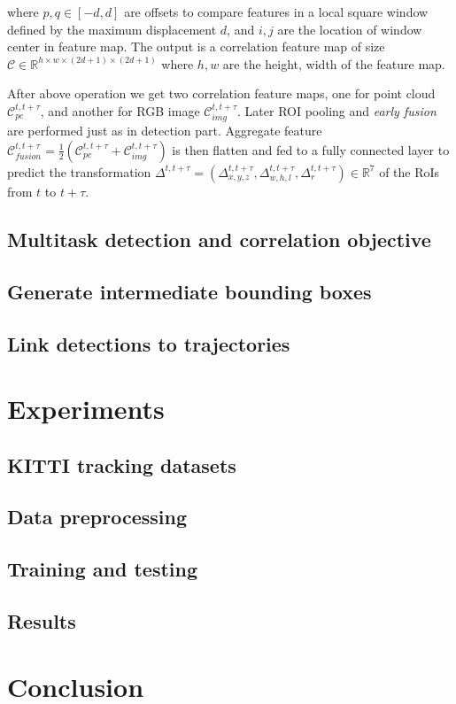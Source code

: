 \documentclass{bmvc2k}
\begin{document}
where $p, q \in [-d, d]$ are offsets to compare features in a local square window defined by the maximum displacement $d$, and $i, j$ are the location of window center in feature map. The output is a correlation feature map of size $\mathcal{C} \in \mathbb{R}^{h \times w \times (2d+1) \times (2d+1)}$ where $h, w$ are the height, width of the feature map.

After above operation we get two correlation feature maps, one for point cloud $\mathcal{C}^{t, t+\tau}_{pc}$, and another for RGB image $\mathcal{C}^{t, t+\tau}_{img}$. Later ROI pooling and \textit{early fusion} are performed just as in detection part. Aggregate feature $\mathcal{C}^{t,t+\tau}_{fusion} = \frac{1}{2}(\mathcal{C}^{t, t+\tau}_{pc} + \mathcal{C}^{t, t+\tau}_{img})$ is then flatten and fed to a fully connected layer to predict the transformation
 $\Delta^{t, t+\tau} = (\Delta^{t,t+\tau}_{x, y, z}, \Delta^{t,t+\tau}_{w, h, l},\Delta^{t,t+\tau}_{r}) \in \mathbb{R}^7$ of the RoIs from $t$ to $t+\tau$. 

\subsection{Multitask detection and correlation objective}

\subsection{Generate intermediate bounding boxes}

\subsection{Link detections to trajectories}


\section{Experiments}
\label{sec:experiments}

\subsection{KITTI tracking datasets}


\subsection{Data preprocessing}


\subsection{Training and testing}

\subsection{Results}

\section{Conclusion}
\label{sec:conclusion}



\end{document}
